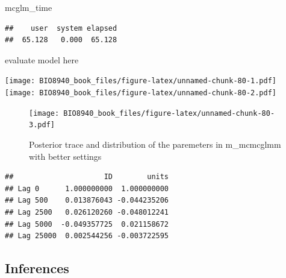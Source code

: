 \documentclass[
  12pt,
]{book}
\newenvironment{Shaded}{\begin{snugshade}}{\end{snugshade}}
\newcommand{\FunctionTok}[1]{\textcolor[rgb]{0.00,0.00,0.00}{#1}}
\newcommand{\NormalTok}[1]{#1}
\newcommand{\SpecialCharTok}[1]{\textcolor[rgb]{0.00,0.00,0.00}{#1}}
\begin{document}
\begin{Shaded}
\begin{Highlighting}[]
\NormalTok{mcglm\_time}
\end{Highlighting}
\end{Shaded}

\begin{verbatim}
##    user  system elapsed 
##  65.128   0.000  65.128
\end{verbatim}

evaluate model here

\begin{Shaded}
\end{Shaded}

\texttt{[image: BIO8940\_book\_files/figure-latex/unnamed-chunk-80-1.pdf]} \texttt{[image: BIO8940\_book\_files/figure-latex/unnamed-chunk-80-2.pdf]}

\begin{Shaded}
\end{Shaded}

\begin{figure}
\centering
\texttt{[image: BIO8940\_book\_files/figure-latex/unnamed-chunk-80-3.pdf]}
\caption{\label{fig:unnamed-chunk-80-3}Posterior trace and distribution of the paremeters in m\_mcmcglmm with better settings}
\end{figure}

\begin{Shaded}
\end{Shaded}

\begin{verbatim}
##                     ID        units
## Lag 0      1.000000000  1.000000000
## Lag 500    0.013876043 -0.044235206
## Lag 2500   0.026120260 -0.048012241
## Lag 5000  -0.049357725  0.021158672
## Lag 25000  0.002544256 -0.003722595
\end{verbatim}

\hypertarget{inferences-2}{%
\subsection{Inferences}\label{inferences-2}}
\end{document}
